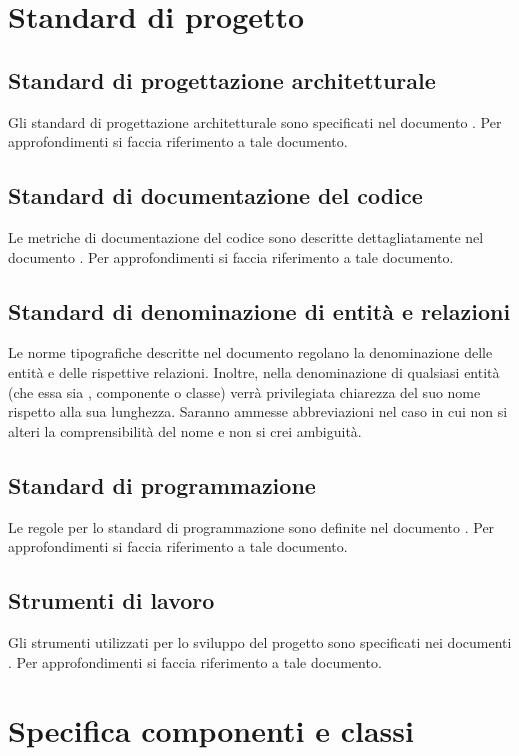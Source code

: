 \documentclass[a4paper, titlepage]{article}
\begin{document}
	\section{Standard di progetto}
	\subsection{Standard di progettazione architetturale}
	Gli standard di progettazione architetturale sono specificati nel documento . Per approfondimenti si faccia riferimento a tale documento.
	\subsection{Standard di documentazione del codice}
	Le metriche di documentazione del codice sono descritte dettagliatamente nel documento . Per approfondimenti si faccia riferimento a tale documento.
	\subsection{Standard di denominazione di entità e relazioni}
	Le norme tipografiche descritte nel documento  regolano la denominazione
	delle entità e delle rispettive relazioni. Inoltre, nella denominazione di qualsiasi entità (che essa sia
	, componente o classe) verrà privilegiata chiarezza del suo nome rispetto alla sua lunghezza.
	Saranno ammesse abbreviazioni nel caso in cui non si alteri la comprensibilità del nome e non si
	crei ambiguità.
	\subsection{Standard di programmazione}
	Le regole per lo standard di programmazione sono definite nel documento . Per approfondimenti si faccia riferimento a tale documento.
	\subsection{Strumenti di lavoro}
	Gli strumenti utilizzati per lo sviluppo del progetto sono specificati nei documenti . Per approfondimenti si faccia riferimento a tale documento.

\newpage
\section{Specifica componenti e classi}

\end{document}
